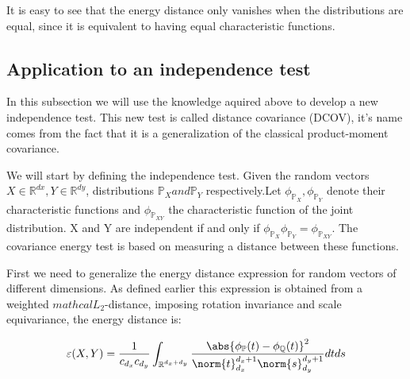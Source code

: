 It is easy to see that the energy distance only vanishes when the distributions are equal, since it is equivalent to having equal characteristic functions.
\subsection{Application to an independence test}
In this subsection we will use the knowledge aquired above to develop a new independence test. This new test is called distance covariance (DCOV), it's name comes from the fact that it is a generalization of the classical product-moment covariance.

We will start by defining the independence test. Given the random vectors $X\in\mathbb{R}^{dx},Y\in\mathbb{R}^{dy}$, distributions $\mathbb{P}_{X} and \mathbb{P}_{Y}$ respectively.Let $\phi_{\mathbb{P}_{X}}, \phi_{\mathbb{P}_{Y}}$ denote their characteristic functions and $\phi_{\mathbb{P}_{XY}}$ the characteristic function of the joint distribution. X and Y are independent if and only if 
$\phi_{\mathbb{P}_{X}}\phi_{\mathbb{P}_{Y}} = \phi_{\mathbb{P}_{XY}}$. The covariance energy test is based on measuring a distance between these functions.

First we need to generalize the energy distance expression for random vectors of different dimensions. As defined earlier this expression is obtained from a weighted $mathcal{L}_{2}$-distance, imposing rotation invariance and scale equivariance, the energy distance is:
\vspace{5mm}

$$\varepsilon(X,Y) = \frac{1}{c_{d_{x}}c_{d_{y}}}\int_{\mathbb{R}^{d_{x} + d_{y}}}\frac{\abs{\phi_{\mathbb{P}}(t)-\phi_{\mathbb{Q}}(t)}^{2}}{\norm{t}^{d_{x}+1}_{d_{x}}\norm{s}^{d_{y}+1}_{d_{y}}}dtds$$

